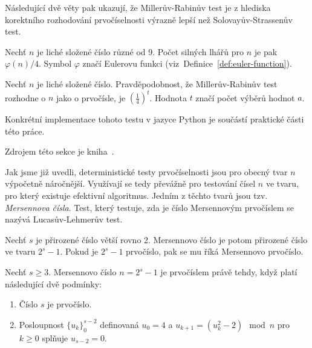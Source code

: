 \documentclass[
  program=infoi,
  biblatex=false,
  figures=true,
  glossaries,
  tables=false,
  sourcecodes=true,
  index
]{kidiplom}
\begin{document}
            Následující dvě věty pak ukazují, že Millerův-Rabinův test je z hlediska korektního rozhodování prvočíselnosti
            výrazně lepší než Solovayův-Strassenův test.

            \begin{theorem}\label{the:miller-rabin-liars-count}
                Nechť $n$ je liché složené číslo různé od 9.
                Počet silných lhářů pro $n$ je pak $\varphi{(n)}/4$.
                Symbol $\varphi$ značí Eulerovu funkci (viz~Definice~\ref{def:euler-function}).
            \end{theorem}

            \begin{theorem}
                Nechť $n$ je liché složené číslo.
                Pravděpodobnost, že Millerův-Rabinův test rozhodne o $n$ jako o prvočísle, je $\left(\frac{1}{4}\right)^t$.
                Hodnota $t$ značí počet výběrů hodnot $a$. 
            \end{theorem}

            Konkrétní implementace tohoto testu v jazyce Python je součástí praktické části této práce.


        \label{sss:mersenne-primes}

            Zdrojem této sekce je kniha~\cite{handbook}.
            
            Jak jsme již uvedli, deterministické testy prvočíselnosti jsou pro obecný tvar $n$ výpočetně náročnější.
            Využívají se tedy převážně pro testování čísel $n$ ve tvaru, pro který existuje efektivní algoritmus.
            Jedním z těchto tvarů jsou tzv. \emph{Mersennova čísla}.
            Test, který testuje, zda je číslo Mersennovým prvočíslem se nazývá Lucasův-Lehmerův test.

            \begin{definition}
                Nechť $s$ je přirozené číslo větší rovno 2.
                Mersennovo číslo je potom přirozené číslo ve tvaru $2^s - 1$.
                Pokud je $2^s - 1$ prvočíslo, pak se mu říká Mersennovo prvočíslo.
            \end{definition}

            \begin{theorem}
                Nechť $s \geq 3$. Mersennovo číslo $n = 2^s - 1$ je prvočíslem právě tehdy, když platí následující dvě podmínky:

                \begin{enumerate}[label=(\roman*)]
                    \item 
                        Číslo $s$ je prvočíslo.
                    \item
                        Posloupnost $\{u_k\}_0^{s-2}$ definovaná $u_0 = 4$ a $u_{k+1} = (u_k^{2} - 2) \mod{n}$ pro $k \geq 0$ splňuje
                        $u_{s-2} = 0$.
                \end{enumerate}
            \end{theorem}
\end{document}
